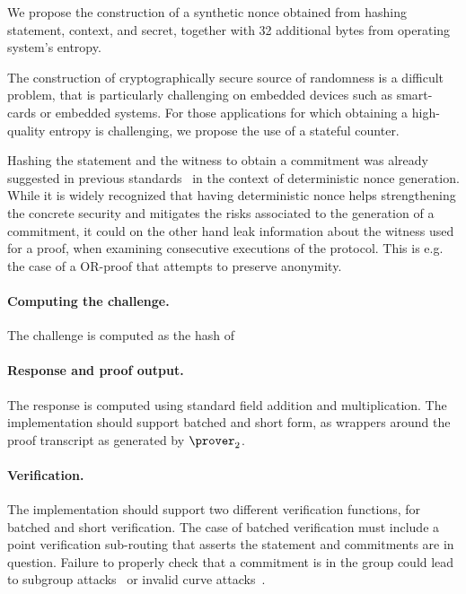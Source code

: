\documentclass[runningheads]{llncs}
\begin{document}
We propose the construction of a synthetic nonce obtained from hashing statement, context, and secret, together with 32 additional bytes from operating system's entropy.

The construction of cryptographically secure source of randomness is a difficult problem, that is particularly challenging on embedded devices such as smart-cards or embedded systems. For those applications for which obtaining a high-quality entropy is challenging, we propose the use of a stateful counter.

Hashing the statement and the witness to obtain a commitment was already suggested in previous standards~\cite{rfc6979} in the context of deterministic nonce generation.
While it is widely recognized that having deterministic nonce helps strengthening the concrete security  and mitigates the risks associated to the generation of a commitment, it could on the other hand leak information about the witness used for a proof, when examining consecutive executions of the protocol. This is e.g. the case of a OR-proof that attempts to preserve anonymity.

\paragraph{Computing the challenge.}
The challenge is computed as the hash of

\paragraph{Response and proof output.} The response is computed using standard field addition and multiplication. The implementation should support batched and short form, as wrappers around the proof transcript as generated by $\prover_2$.
\paragraph{Verification.} The implementation should support two different verification functions, for batched and short verification.
The case of batched verification must include a point verification sub-routing that asserts the statement and commitments are in question. Failure to properly check that a commitment is in the group could lead to subgroup attacks~\cite{EC:VanWie96,C:LimLee97} or invalid curve attacks~\cite{C:BieMeyMul00,RSA:BBPV12}.
\end{document}
